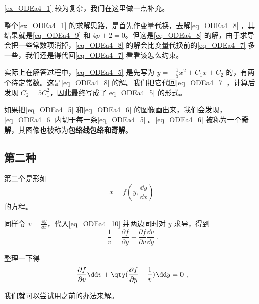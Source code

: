 \autoref{ex_ODEa4_1} 较为复杂，我们在这里做一点补充。

整个\autoref{ex_ODEa4_1} 的求解思路，是首先作变量代换，去解\autoref{eq_ODEa4_8} ，其结果就是\autoref{eq_ODEa4_9} 和 $4p+2=0$。但这是\autoref{eq_ODEa4_8} 的解，由于求导会把一些常数项消掉，\autoref{eq_ODEa4_8} 的解会比变量代换前的\autoref{eq_ODEa4_7} 多一些，我们还是得代回\autoref{eq_ODEa4_7} 看看该怎么约束。

实际上在解答过程中，\autoref{eq_ODEa4_5} 是先写为 $y=-\frac{1}{5}x^2+C_1x+C_2$ 的，有两个待定常数。这是\autoref{eq_ODEa4_8} 的解。我们把它代回\autoref{eq_ODEa4_7} ，计算后发现 $C_2=5C_1^2$，因此最终写成了\autoref{eq_ODEa4_5} 的形式。

如果把\autoref{eq_ODEa4_5} 和\autoref{eq_ODEa4_6} 的图像画出来，我们会发现，\autoref{eq_ODEa4_6} 内切于每一条\autoref{eq_ODEa4_5} 
。\autoref{eq_ODEa4_6} 被称为一个\textbf{奇解}，其图像也被称为\textbf{包络线包络和奇解}。








\subsection{第二种}

第二个是形如
\begin{equation}\label{eq_ODEa4_10}
x=f(y, \frac{\dd y}{\dd x})~
\end{equation}
的方程。

同样令 $v=\frac{\dd y}{\dd x}$，代入\autoref{eq_ODEa4_10} 并两边同时对 $y$ 求导，得到
\begin{equation}
\frac{1}{v}=\frac{\partial f}{\partial y}+\frac{\partial f}{\partial v}\frac{\dd v}{\dd y}~.
\end{equation}

整理一下得
\begin{equation}\label{eq_ODEa4_13}
\frac{\partial f}{\partial v}\dd v +\qty(\frac{\partial f}{\partial y}-\frac{1}{v})\dd y=0~,
\end{equation}

我们就可以尝试用之前的办法来解。


